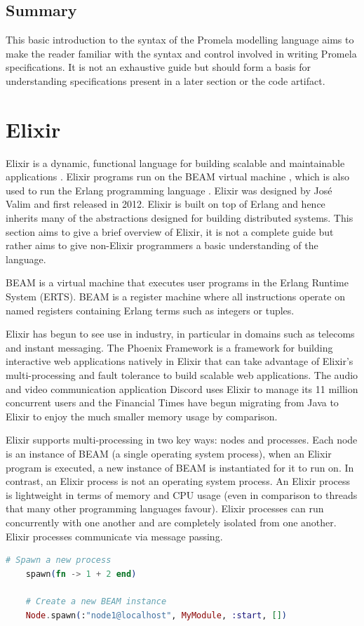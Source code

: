 \subsection{Summary}
This basic introduction to the syntax of the Promela modelling language aims to make the reader familiar with the syntax and control involved in writing Promela specifications. It is not an exhaustive guide but should form a basis for understanding specifications present in a later section or the code artifact.

\section{Elixir}
Elixir is a dynamic, functional language for building scalable and maintainable applications \cite{elixir}. Elixir programs run on the BEAM virtual machine \cite{beam}, which is also used to run the Erlang programming language \cite{erlang}. Elixir was designed by José Valim and first released in 2012. Elixir is built on top of Erlang and hence inherits many of the abstractions designed for building distributed systems. This section aims to give a brief overview of Elixir, it is not a complete guide but rather aims to give non-Elixir programmers a basic understanding of the language.
\par
BEAM is a virtual machine that executes user programs in the Erlang Runtime System (ERTS). BEAM is a register machine where all instructions operate on named registers containing Erlang terms such as integers or tuples.
\par
Elixir has begun to see use in industry, in particular in domains such as telecoms and instant messaging. The Phoenix Framework \cite{phoenix} is a framework for building interactive web applications natively in Elixir that can take advantage of Elixir's multi-processing and fault tolerance to build scalable web applications. The audio and video communication application Discord \cite{discord} uses Elixir to manage its 11 million concurrent users and the Financial Times \cite{ft} have begun migrating from Java to Elixir to enjoy the much smaller memory usage by comparison.
\par
Elixir supports multi-processing in two key ways: nodes and processes. Each node is an instance of BEAM (a single operating system process), when an Elixir program is executed, a new instance of BEAM is instantiated for it to run on. In contrast, an Elixir process is not an operating system process. An Elixir process is lightweight in terms of memory and CPU usage (even in comparison to threads that many other programming languages favour). Elixir processes can run concurrently with one another and are completely isolated from one another. Elixir processes communicate via message passing.
\begin{lstlisting}[language=Elixir, xleftmargin=.2\linewidth, caption={An example of spawn/1 and spawn/4 in Elixir for spawning a new lightweight process and a new Elixir node}]
    # Spawn a new process
    spawn(fn -> 1 + 2 end)

    # Create a new BEAM instance
    Node.spawn(:"node1@localhost", MyModule, :start, [])
\end{lstlisting}
